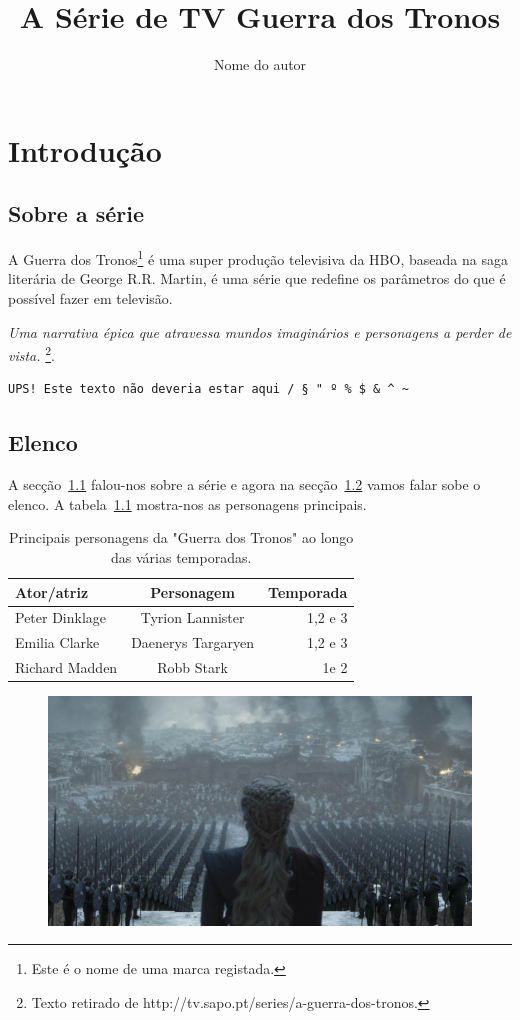 \documentclass[11pt, a4paper]{report}
\title{A Série de TV Guerra dos Tronos}
\author{Nome do autor}
\date{}
\begin{document}
\maketitle
\chapter{Introdução}
\section{Sobre a série}
\label{sec:sobre}
A {\Huge Guerra dos Tronos}\footnote{Este é o nome de uma marca registada.} é uma super produç\~ao televisiva da HBO, baseada na saga literária de George R.R. Martin, é uma série que {\tiny redefine os parâmetros do que é possível fazer em televis\~ao}.

\vspace{1cm}

{\centering \textit{Uma narrativa épica que {\Large atravessa mundos imaginários} e personagens a perder de vista.} \footnote{Texto retirado de http://tv.sapo.pt/series/a-guerra-dos-tronos.}.\par}

\vspace{1cm}

\begin{verbatim}
UPS! Este texto não deveria estar aqui / § " º % $ & ^ ~
\end{verbatim}

\section{Elenco}
\label{sec:elen}
A secç\~ao~\ref{sec:sobre} falou-nos sobre a série e agora na secç\~ao~\ref{sec:elen} vamos falar sobe o elenco. A tabela~\ref{tab:tab} mostra-nos as personagens principais.

\begin{table}[]
\centering
\begin{tabular}{|l|c|r|}
\hline
\textbf{Ator/atriz} & \textbf{Personagem} & \textbf{Temporada} \\ \hline
Peter Dinklage      & Tyrion Lannister    & 1,2 e 3            \\ \hline
Emilia Clarke       & Daenerys Targaryen  & 1,2 e 3            \\ \hline
Richard Madden      & Robb Stark          & 1e 2               \\ \hline
\end{tabular}
\caption{Principais personagens da "Guerra dos Tronos" ao longo das várias temporadas.}
\label{tab:tab}
\end{table}

\begin{figure}
\centering
\includegraphics[scale=0.3]{got.jpg}
\end{figure}
\end{document}
